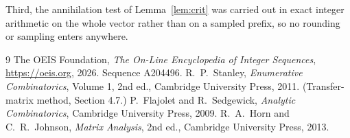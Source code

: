 \documentclass[11pt,a4paper]{article}
\theoremstyle{plain}
\theoremstyle{definition}
\begin{document}
Third, the annihilation test of Lemma~\ref{lem:crit} was carried out in exact integer
arithmetic on the whole vector rather than on a sampled prefix, so no rounding or sampling
enters anywhere.

\begin{thebibliography}{9}
 The OEIS Foundation, \emph{The On-Line Encyclopedia of Integer
Sequences}, \url{https://oeis.org}, 2026. Sequence A204496.
 R.~P.~Stanley, \emph{Enumerative Combinatorics}, Volume 1, 2nd ed.,
Cambridge University Press, 2011. (Transfer-matrix method, Section 4.7.)
 P.~Flajolet and R.~Sedgewick, \emph{Analytic Combinatorics}, Cambridge
University Press, 2009.
 R.~A.~Horn and C.~R.~Johnson, \emph{Matrix Analysis}, 2nd ed., Cambridge
University Press, 2013.
\end{thebibliography}
\end{document}
